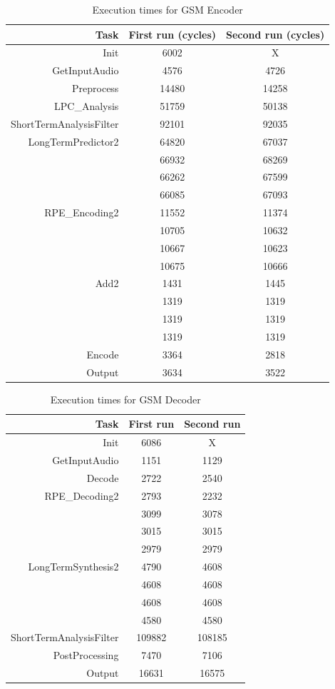 \documentclass[a4paper, 12pt]{article}
\begin{document}
\begin{table}[h]
  \centering
  \begin{tabular}{r c c}
    \hline
    Task & First run (cycles) & Second run (cycles) \\
    \hline
    Init & 6002  & X \\
    GetInputAudio & 4576  & 4726 \\
    Preprocess & 14480  & 14258  \\
    LPC\_Analysis & 51759  & 50138 \\
    ShortTermAnalysisFilter & 92101 & 92035 \\
    LongTermPredictor2 &64820&67037\\
                       &66932&68269\\
                       &66262&67599\\
                       &66085&67093\\
    RPE\_Encoding2 &11552&11374\\
                   &10705&10632\\
                   &10667&10623\\
                   &10675&10666\\
    Add2 &1431&1445\\
         &1319&1319\\
         &1319&1319\\
         &1319&1319\\
    Encode & 3364 & 2818 \\
    Output & 3634 & 3522 \\
  \end{tabular}
  \caption{Execution times for GSM Encoder}
\end{table}


\begin{table}[h]
  \centering
  \begin{tabular}{r c c}
    \hline
    Task & First run & Second run \\
    \hline
    Init & 6086 & X \\
    GetInputAudio &1151 & 1129\\
    Decode & 2722& 2540\\
    RPE\_Decoding2 &2793&2232\\
                   &3099&3078\\
                   &3015&3015\\
                   &2979&2979\\
    LongTermSynthesis2 &4790&4608\\
                       &4608&4608\\
                       &4608&4608\\
                       &4580&4580\\
    ShortTermAnalysisFilter & 109882 & 108185\\
    PostProcessing & 7470& 7106\\
    Output & 16631& 16575\\
  \end{tabular}
  \caption{Execution times for GSM Decoder}
\end{table}
\end{document}
